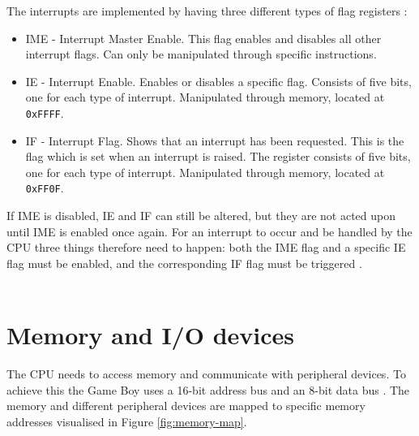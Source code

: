 The interrupts are implemented by having three different types of flag registers \cite{pandocsinterrupts}:
\begin{itemize}
    \item IME - Interrupt Master Enable. This flag enables and disables all other interrupt flags. Can only be manipulated through specific instructions.
    \item IE - Interrupt Enable. Enables or disables a specific flag. Consists of five bits, one for each type of interrupt. Manipulated through memory, located at \texttt{0xFFFF}.
    \item IF - Interrupt Flag. Shows that an interrupt has been requested. This is the flag which is set when an interrupt is raised. The register consists of five bits, one for each type of interrupt. Manipulated through memory, located at \texttt{0xFF0F}.
    \\
\end{itemize}
If IME is disabled, IE and IF can still be altered, but they are not acted upon until IME is enabled once again. For an interrupt to occur and be handled by the CPU three things therefore need to happen: both the IME flag and a specific IE flag must be enabled, and the corresponding IF flag must be triggered \cite{pandocsinterrupts}. 
\\\\
\newpage
\section{Memory and I/O devices}
\label{sec:MMUTheory}
The CPU needs to access memory and communicate with peripheral devices. To achieve this the Game Boy uses a 16-bit address bus and an 8-bit data bus \cite{TCAGBD}. The memory and different peripheral devices are mapped to specific memory addresses visualised in Figure \ref{fig:memory-map}.



